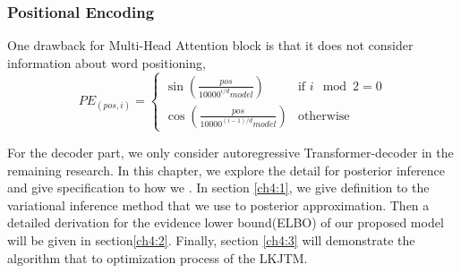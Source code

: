 \subsubsection{Positional Encoding}
One drawback for Multi-Head Attention block is that it does not consider information about word positioning, 
\[ PE_{(pos,i)} = \begin{cases} 
\sin\left(\frac{pos}{10000^{i/d}model}\right) & \text{if }i \mod 2 = 0 \\
\cos\left(\frac{pos}{10000^{(i-1)/d}model}\right) & \text{otherwise}
       \end{cases}
    \]
    
For the decoder part, we only consider autoregressive Transformer-decoder in the remaining research.
In this chapter, we explore the detail for posterior inference and give specification to how we . In section \ref{ch4:1}, we give definition to the variational inference method that we use to posterior approximation. Then a detailed derivation for the evidence lower bound(ELBO) of our proposed model will be given in section\ref{ch4:2}. Finally, section \ref{ch4:3} will demonstrate the algorithm that to optimization process of the LKJTM.
